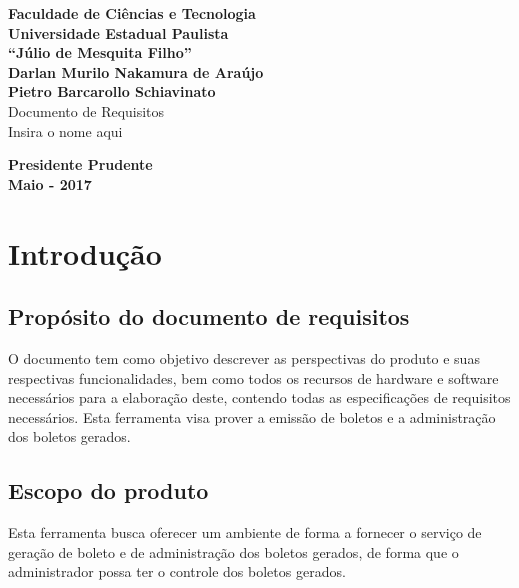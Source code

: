 \documentclass[12pt,a4paper,onecolumn,titlepage]{article}
\begin{document}

\begin{titlepage} %
	
	\vfill
	\begin{center}
	
		{\large \textbf{Faculdade de Ciências e Tecnologia\\Universidade Estadual Paulista\\``Júlio de Mesquita Filho''}} \\[3cm]
		{\large \textbf{Darlan Murilo Nakamura de Araújo\\Pietro Barcarollo Schiavinato}}\\[4cm]
		{\Large Documento de Requisitos}\\
		{\Large Insira o nome aqui}\\[4cm]


	\vfill
	\vspace{1.5cm}
	
	\large \textbf{Presidente Prudente\\}
	\large \textbf{Maio - 2017}
	
	\end{center}
	
\end{titlepage}
\newpage

\renewcommand{\contentsname}{Índice}
\tableofcontents
\newpage
\section{Introdução}
\label{sect:intro}

\subsection{Propósito do documento de requisitos}

O documento tem como objetivo descrever as perspectivas do produto e suas
respectivas funcionalidades, bem como todos os recursos de hardware e software necessários para a elaboração deste, contendo todas as especificações de
requisitos necessários. Esta ferramenta visa prover a emissão de boletos e a administração dos boletos gerados.

\subsection{Escopo do produto}

Esta ferramenta busca oferecer um ambiente de forma a fornecer o serviço de geração de boleto e de administração dos boletos gerados, de forma que o administrador possa ter o controle dos boletos gerados.
\end{document}
